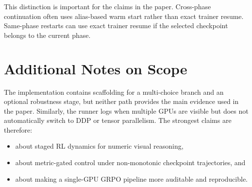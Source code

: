 \documentclass{article} %
\begin{document}
This distinction is important for the claims in the paper. Cross-phase continuation often uses alias-based warm start rather than exact trainer resume. Same-phase restarts can use exact trainer resume if the selected checkpoint belongs to the current phase.

\section{Additional Notes on Scope}

The implementation contains scaffolding for a multi-choice branch and an optional robustness stage, but neither path provides the main evidence used in the paper. Similarly, the runner logs when multiple GPUs are visible but does not automatically switch to DDP or tensor parallelism. The strongest claims are therefore:
\begin{itemize}[leftmargin=1.2em]
\item about staged RL dynamics for numeric visual reasoning,
\item about metric-gated control under non-monotonic checkpoint trajectories, and
\item about making a single-GPU GRPO pipeline more auditable and reproducible.
\end{itemize}
\end{document}
